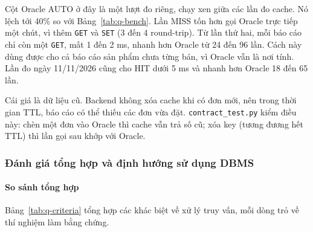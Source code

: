 Cột Oracle AUTO ở đây là một lượt đo riêng, chạy xen giữa các lần đo cache. Nó lệch tới 40\% so với Bảng~\ref{tab:q-bench}. Lần MISS tốn hơn gọi Oracle trực tiếp một chút, vì thêm \texttt{GET} và \texttt{SET} (3 đến 4 round-trip). Từ lần thứ hai, mỗi báo cáo chỉ còn một \texttt{GET}, mất 1 đến 2 ms, nhanh hơn Oracle từ 24 đến 96 lần. Cách này dùng được cho cả báo cáo sản phẩm chưa từng bán, vì Oracle vẫn là nơi tính. Lần đo ngày 11/11/2026 cũng cho HIT dưới 5 ms và nhanh hơn Oracle 18 đến 65 lần.

Cái giá là dữ liệu cũ. Backend không xóa cache khi có đơn mới, nên trong thời gian TTL, báo cáo có thể thiếu các đơn vừa đặt. \texttt{contract\_test.py} kiểm điều này: chèn một đơn vào Oracle thì cache vẫn trả số cũ; xóa key (tương đương hết TTL) thì lần gọi sau khớp với Oracle.

\subsubsection{Đánh giá tổng hợp và định hướng sử dụng DBMS}\label{sec:q-conclusion}

\paragraph{So sánh tổng hợp}\label{sec:q-compare}

Bảng~\ref{tab:q-criteria} tổng hợp các khác biệt về xử lý truy vấn, mỗi dòng trỏ về thí nghiệm làm bằng chứng.

